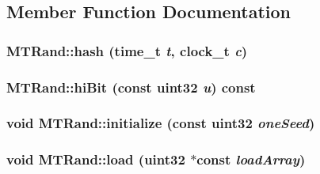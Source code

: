 \begin{CompactItemize}
\begin{CompactItemize}
\subsection{Member Function Documentation}
\hypertarget{classMTRand_486885d03f38c844315d002e6312fa23}{
\subsubsection[{hash}]{ MTRand::hash (time\_\-t {\em t}, \/  clock\_\-t {\em c})}}
\label{classMTRand_486885d03f38c844315d002e6312fa23}


\hypertarget{classMTRand_45eea926a0602e4bb5c0b90b04779826}{
\subsubsection[{hiBit}]{ MTRand::hiBit (const {\bf uint32} {\em u}) const}}
\label{classMTRand_45eea926a0602e4bb5c0b90b04779826}


\hypertarget{classMTRand_9b9a20998f5c805af6301ce5c37dcfc3}{
\subsubsection[{initialize}]{\setlength{\rightskip}{0pt plus 5cm}void MTRand::initialize (const {\bf uint32} {\em oneSeed})}}
\label{classMTRand_9b9a20998f5c805af6301ce5c37dcfc3}


\hypertarget{classMTRand_8302e9a8cd16d8dfc536a85bf2f68be0}{
\subsubsection[{load}]{\setlength{\rightskip}{0pt plus 5cm}void MTRand::load ({\bf uint32} $\ast$const  {\em loadArray})}}
\label{classMTRand_8302e9a8cd16d8dfc536a85bf2f68be0}



\end{CompactItemize}
\end{CompactItemize}
